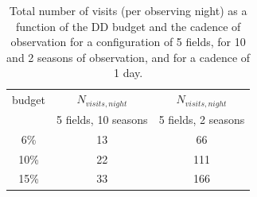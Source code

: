 \documentclass[\docopts]{\docclass}
\begin{document}
\begin{table}[!htbp]
  \caption{Total number of visits (per observing night) as a function of the DD budget and the cadence of observation for a configuration of 5 fields, for 10 and 2 seasons of observation, and for a cadence of 1 day.  }\label{tab:ddbudget}
  \begin{center}
    \begin{tabular}{c|c|c}
      \hline
      \hline
      budget & $N_{visits, night}$ & $N_{visits, night}$\\
                    & 5 fields, 10 seasons & 5 fields, 2 seasons \\
      \hline
      6\% & 13 & 66 \\
      10\% & 22 & 111 \\
      15\% & 33 & 166 \\
      \hline
    \end{tabular}
  \end{center}
\end{table}
\end{document}
